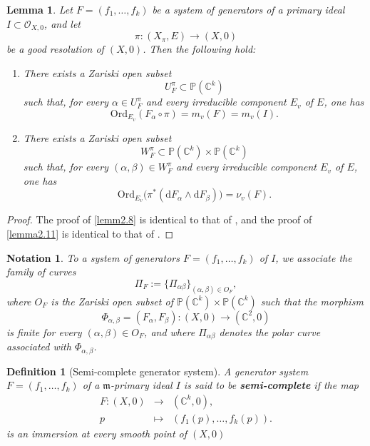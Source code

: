 \documentclass[reqno,dvipsnames,12pt]{amsart}
\newtheorem{lemm}[thm]{Lemma}
\newtheorem{nota}[thm]{Notation}
\newtheorem{defi}[thm]{Definition}
\begin{document}
\begin{lemm}\label{laminimalitédelamultiplicité}
Let $F=(f_1,\dots,f_k)$ be a system of generators of a primary ideal $I\subset \mathcal{O}_{X,0}$, and let
\[
\pi:(X_{\pi},E)\longrightarrow (X,0)
\]
be a good resolution of $(X,0)$. Then the following hold:

\begin{enumerate}
    \item There exists a Zariski open subset
    \[
    U_F^{\pi}\subset \mathbb{P}(\mathbb{C}^k)
    \]
    such that, for every $\alpha\in U_F^{\pi}$ and every irreducible component $E_v$ of $E$, one has
    \[
    \mathrm{Ord}_{E_v}(F_{\alpha}\circ \pi)=m_v(F)=m_v(I).
    \]
    \label{lemm2.8}

    \item \label{l'ouvertdezariski} There exists a Zariski open subset
    \[
    W_F^{\pi}\subset \mathbb{P}(\mathbb{C}^k)\times \mathbb{P}(\mathbb{C}^k)
    \]
    such that, for every $(\alpha,\beta)\in W_F^{\pi}$ and every irreducible component $E_v$ of $E$, one has
    \[
    \mathrm{Ord}_{E_v}\!\bigl(\pi^*(\mathrm{d}F_{\alpha}\wedge \mathrm{d}F_{\beta})\bigr)
    =\nu_v(F).
    \]
    \label{lemma2.11}
\end{enumerate}
\end{lemm}

\begin{proof}
The proof of \ref{lemm2.8} is identical to that of \cite[Lemma 2.8]{yenni2}, and the proof of \ref{lemma2.11} is identical to that of \cite[Lemma 2.11]{yenni2}.
\end{proof}



\begin{nota}
To a system of generators $F=(f_1,\dots,f_k)$ of $I$, we associate the family of curves
\[
\Pi_F:=\{\Pi_{\alpha\beta}\}_{(\alpha,\beta)\in O_F},
\]
where $O_F$ is the Zariski open subset of
$\mathbb{P}(\mathbb{C}^k)\times\mathbb{P}(\mathbb{C}^k)$
such that the morphism
\[
\Phi_{\alpha,\beta}=(F_{\alpha},F_{\beta}):(X,0)\longrightarrow (\mathbb{C}^2,0)
\]
is finite for every $(\alpha,\beta)\in O_F$, and where $\Pi_{\alpha\beta}$ denotes the polar curve associated with $\Phi_{\alpha,\beta}$. 
\end{nota}
\begin{defi}[Semi-complete generator system]
    A generator system $F=(f_1,\dots,f_k)$ of a $\mathfrak{m}$-primary ideal $I$  is said to be \textbf{semi-complete} if the map $$
\begin{array}{rcl}
F \colon (X,0) &\longrightarrow&  (\mathbb{C}^k,0),\\[1mm]
p &\longmapsto& (f_1(p),\dots,f_k(p)).
\end{array}
$$ is an immersion at every smooth point of $(X,0)$
\end{defi}
\end{document}
